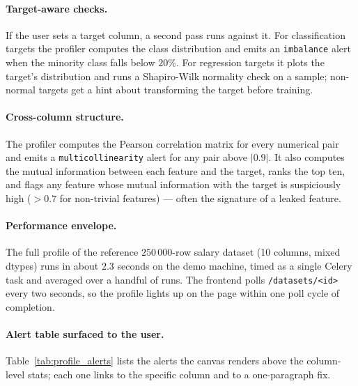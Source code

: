 \documentclass[12pt, a4paper, oneside]{report}
\begin{document}
\paragraph{Target-aware checks.} If the user sets a target column, a
second pass runs against it. For classification targets the profiler
computes the class distribution and emits an \texttt{imbalance} alert
when the minority class falls below $20\%$. For regression targets it
plots the target's distribution and runs a Shapiro-Wilk normality
check on a sample; non-normal targets get a hint about transforming
the target before training.

\paragraph{Cross-column structure.} The profiler computes the
Pearson correlation matrix for every numerical pair and emits a
\texttt{multicollinearity} alert for any pair above $|0.9|$. It also
computes the mutual information between each feature and the target,
ranks the top ten, and flags any feature whose mutual information
with the target is suspiciously high ($> 0.7$ for non-trivial
features) --- often the signature of a leaked feature.

\paragraph{Performance envelope.} The full profile of the reference
$250\,000$-row salary dataset (10 columns, mixed dtypes) runs in
about $2.3$ seconds on the demo machine, timed as a single Celery
task and averaged over a handful of runs. The frontend polls
\texttt{/datasets/<id>} every two seconds, so the profile lights up
on the page within one poll cycle of completion.

\paragraph{Alert table surfaced to the user.}
Table~\ref{tab:profile_alerts} lists the alerts the canvas renders
above the column-level stats; each one links to the specific column
and to a one-paragraph fix.
\end{document}
